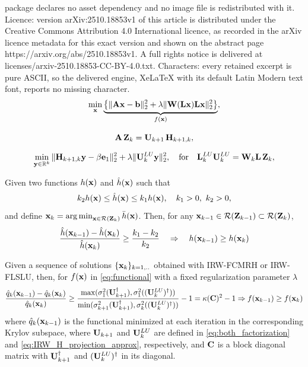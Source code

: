 \documentclass[10pt,a4paper]{amsart}
\DeclareMathOperator*{\argmin}{arg\,min}                   %
\newcommand{\bfA}{{\bf A}}
\newcommand{\bfC}{{\bf C}}
\newcommand{\bfH}{{\bf H}}
\newcommand{\bfL}{{\bf L}}
\newcommand{\bfU}{{\bf U}}
\newcommand{\bfW}{{\bf W}}
\newcommand{\bfZ}{{\bf Z}}
\newcommand{\bfb}{{\bf b}}
\newcommand{\bfe}{{\bf e}}
\newcommand{\bfx}{{\bf x}}
\newcommand{\bfy}{{\bf y}}
\begin{document}
package declares no asset dependency and no image file is redistributed with it. Licence: version arXiv:2510.18853v1 of this article is distributed under the Creative Commons Attribution 4.0 International licence, as recorded in the arXiv licence metadata for this exact version and shown on the abstract page https://arxiv.org/abs/2510.18853v1. A full rights notice is delivered at licenses/arxiv-2510.18853-CC-BY-4.0.txt. Characters: every retained excerpt is pure ASCII, so the delivered engine, XeLaTeX with its default Latin Modern text font, reports no missing character.
\begin{equation}\label{eq:functional}
\displaystyle \min_\bfx \underbrace{\left\{\| \bfA \bfx - \bfb \|_2^2 + \lambda \|\bfW(\bfL \bfx) \bfL \bfx \|_2^2\right\}}_{f(\bfx)},
\end{equation}

\begin{equation}\label{eq:both_factorization}
    \bfA \, \bfZ_{k} = \bfU_{k+1}  \, \bfH_{k+1,k},
\end{equation}

\begin{equation}\label{eq:IRW_H_projection_approx}
   \min_{\bfy\in\mathbb{R}^k} \| \bfH_{k+1,k}\bfy -\beta \bfe_1 \|_2^2+\lambda\|\bfU^{LU}_k\bfy\|_2^2, \quad \text{for} \quad \bfL^{LU}_k\bfU^{LU}_k = \bfW_k \bfL\,\bfZ_k,
\end{equation}

\begin{lemma}\label{lemma1} Given two functions $h(\bfx)$ and $\hat h(\bfx)$ such that
\[
k_2 h(\bfx) \leq \hat h(\bfx) \leq k_1 h(\bfx), \quad k_1 > 0, \  k_2 > 0,
\]
and define $ \bfx_k=\argmin_{\bfx\in\mathcal{R}(\bfZ_k)} \bar h (\bfx)$. Then, for any $\bfx_{k-1}\in \mathcal{R}(\bfZ_{k-1}) \subset \mathcal{R}(\bfZ_k)$,
\[
\frac{\hat h(\bfx_{k-1})-\hat h(\bfx_{k})}{\hat h(\bfx_{k})} \geq\frac{k_1-k_2}{k_2} \quad  \Rightarrow \quad  h(\bfx_{k-1}) \geq h(\bfx_{k}) 
\]
\end{lemma}

\begin{proposition}\label{prop3} Given a sequence of solutions $\{\bfx_k\}_{k=1,..	}$ obtained with IRW-FCMRH or IRW-FLSLU, then,
for $f(\bfx)$ in \eqref{eq:functional} with a fixed regularization parameter $\lambda$ %
\[\frac{\hat q_k(\bfx_{k-1})-\hat q_k(\bfx_{k})}{\hat q_k(\bfx_{k})} \geq \frac{\max(\sigma_1^2(\bfU_{k+1}^{\dagger}),\sigma_1^2((\bfU_{k}^{LU})^{\dagger}))}{\min(\sigma_{k+1}^2(\bfU_{k+1}^{\dagger}),\sigma_k^2((\bfU_{k}^{LU})^{\dagger}))}-1 = \kappa(\bfC)^2-1 \Rightarrow f(\bfx_{k-1}) \geq f(\bfx_k) \]
where $\hat q_k(\bfx_{k-1})$ is the functional minimized at each iteration in the corresponding Krylov subspace, where 
$\bfU_{k+1}$ and $\bfU^{LU}_{k}$ are defined in  \eqref{eq:both_factorization} and \eqref{eq:IRW_H_projection_approx}, respectively, and $\bfC$ is a block diagonal matrix with $\bfU_{k+1}^{\dagger}$ and $(\bfU^{LU}_{k})^{\dagger}$ in its diagonal. 
\end{proposition}
\end{document}
